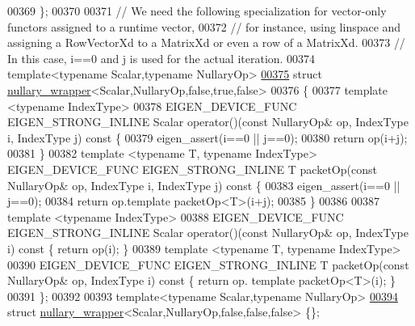 \begin{DoxyCode}
00369 \};
00370 
00371 \textcolor{comment}{// We need the following specialization for vector-only functors assigned to a runtime vector,}
00372 \textcolor{comment}{// for instance, using linspace and assigning a RowVectorXd to a MatrixXd or even a row of a MatrixXd.}
00373 \textcolor{comment}{// In this case, i==0 and j is used for the actual iteration.}
00374 \textcolor{keyword}{template}<\textcolor{keyword}{typename} Scalar,\textcolor{keyword}{typename} NullaryOp>
\hyperlink{struct_eigen_1_1internal_1_1nullary__wrapper_3_01_scalar_00_01_nullary_op_00_01false_00_01true_00_01false_01_4}{00375} \textcolor{keyword}{struct }\hyperlink{struct_eigen_1_1internal_1_1nullary__wrapper}{nullary\_wrapper}<Scalar,NullaryOp,false,true,false>
00376 \{
00377   \textcolor{keyword}{template} <\textcolor{keyword}{typename} IndexType>
00378   EIGEN\_DEVICE\_FUNC EIGEN\_STRONG\_INLINE Scalar operator()(\textcolor{keyword}{const} NullaryOp& op, IndexType i, IndexType j)\textcolor{keyword}{
       const }\{
00379     eigen\_assert(i==0 || j==0);
00380     \textcolor{keywordflow}{return} op(i+j);
00381   \}
00382   \textcolor{keyword}{template} <\textcolor{keyword}{typename} T, \textcolor{keyword}{typename} IndexType> EIGEN\_DEVICE\_FUNC EIGEN\_STRONG\_INLINE T packetOp(\textcolor{keyword}{const} 
      NullaryOp& op, IndexType i, IndexType j)\textcolor{keyword}{ const }\{
00383     eigen\_assert(i==0 || j==0);
00384     \textcolor{keywordflow}{return} op.template packetOp<T>(i+j);
00385   \}
00386 
00387   \textcolor{keyword}{template} <\textcolor{keyword}{typename} IndexType>
00388   EIGEN\_DEVICE\_FUNC EIGEN\_STRONG\_INLINE Scalar operator()(\textcolor{keyword}{const} NullaryOp& op, IndexType i)\textcolor{keyword}{ const }\{ \textcolor{keywordflow}{return} 
      op(i); \}
00389   \textcolor{keyword}{template} <\textcolor{keyword}{typename} T, \textcolor{keyword}{typename} IndexType>
00390   EIGEN\_DEVICE\_FUNC EIGEN\_STRONG\_INLINE T packetOp(\textcolor{keyword}{const} NullaryOp& op, IndexType i)\textcolor{keyword}{ const }\{ \textcolor{keywordflow}{return} op.
      template packetOp<T>(i); \}
00391 \};
00392 
00393 \textcolor{keyword}{template}<\textcolor{keyword}{typename} Scalar,\textcolor{keyword}{typename} NullaryOp>
\hyperlink{struct_eigen_1_1internal_1_1nullary__wrapper_3_01_scalar_00_01_nullary_op_00_01false_00_01false_00_01false_01_4}{00394} \textcolor{keyword}{struct }\hyperlink{struct_eigen_1_1internal_1_1nullary__wrapper}{nullary\_wrapper}<Scalar,NullaryOp,false,false,false> \{\};

\end{DoxyCode}
